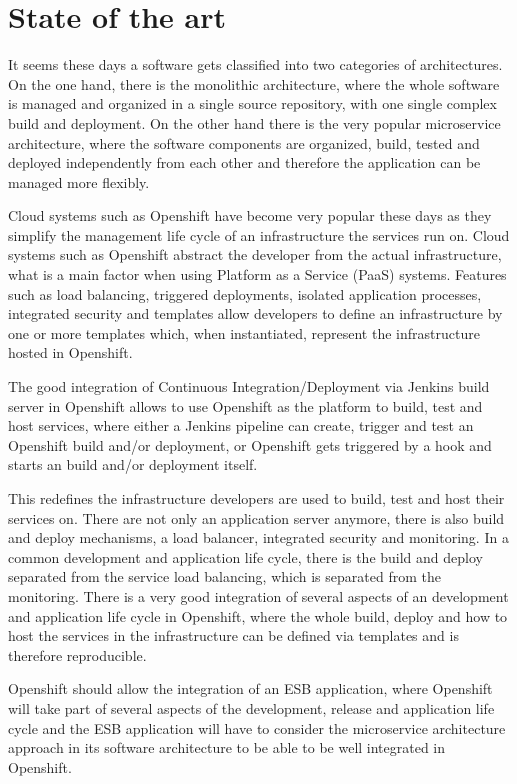 \section{State of the art}
\label{sec:state-of-the-art}
It seems these days a software gets classified into two categories of architectures. On the one hand,  there is the monolithic architecture, where the whole software is managed and organized in a single source repository, with one single complex build and deployment. On the other hand there is the very popular microservice architecture, where the software components are organized, build, tested and deployed independently from each other and therefore the application can be managed more flexibly.

Cloud systems such as Openshift have become very popular these days as they simplify the management life cycle of an infrastructure the services run on. Cloud systems such as Openshift abstract the developer from the actual infrastructure, what is a main factor when using Platform as a Service (PaaS) systems. Features such as load balancing, triggered deployments, isolated application processes, integrated security and templates allow developers to define an infrastructure by one or more templates which, when instantiated, represent the infrastructure hosted in Openshift.

The good integration of Continuous Integration/Deployment via Jenkins build server in Openshift allows to use Openshift as the platform to build, test and host services, where either a Jenkins pipeline can create, trigger and test an Openshift build and/or deployment, or Openshift gets triggered by a hook and starts an build and/or deployment itself.

This redefines the infrastructure developers are used to build, test and host their services on. There are not only an application server anymore, there is also build and deploy mechanisms, a load balancer, integrated security and monitoring. In a common development and application life cycle, there is the build and deploy separated from the service load balancing, which is separated from the monitoring. There is a very good integration of several aspects of an development and application life cycle in Openshift, where the whole build, deploy and how to host the services in the infrastructure can be defined via templates and is therefore reproducible.

Openshift should allow the integration of an ESB application, where Openshift will take part of several aspects of the development, release and application life cycle and the ESB application will have to consider the microservice architecture approach in its software architecture to be able to be well integrated in Openshift.

